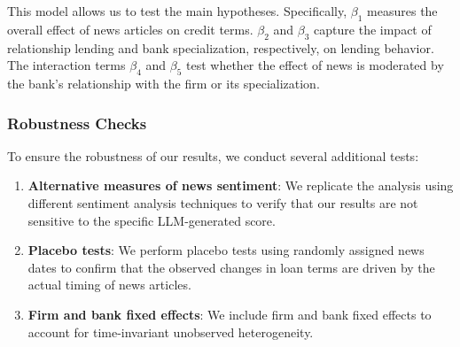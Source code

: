 This model allows us to test the main hypotheses. Specifically, $\beta_1$ measures the overall effect of news articles on credit terms. $\beta_2$ and $\beta_3$ capture the impact of relationship lending and bank specialization, respectively, on lending behavior. The interaction terms $\beta_4$ and $\beta_5$ test whether the effect of news is moderated by the bank's relationship with the firm or its specialization.

\subsubsection{Robustness Checks}

To ensure the robustness of our results, we conduct several additional tests:
\begin{enumerate}
    \item \textbf{Alternative measures of news sentiment}: We replicate the analysis using different sentiment analysis techniques to verify that our results are not sensitive to the specific LLM-generated score.
    \item \textbf{Placebo tests}: We perform placebo tests using randomly assigned news dates to confirm that the observed changes in loan terms are driven by the actual timing of news articles.
    \item \textbf{Firm and bank fixed effects}: We include firm and bank fixed effects to account for time-invariant unobserved heterogeneity.
\end{enumerate}


